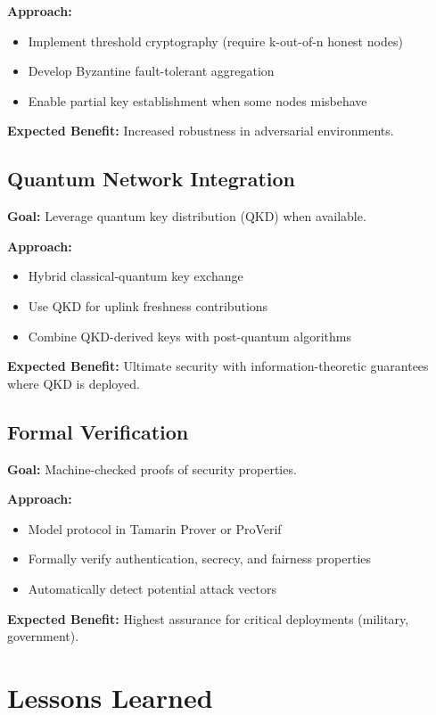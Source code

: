 \documentclass[12pt,a4paper]{report}
\begin{document}
\textbf{Approach:}
\begin{itemize}
\item Implement threshold cryptography (require k-out-of-n honest nodes)
\item Develop Byzantine fault-tolerant aggregation
\item Enable partial key establishment when some nodes misbehave
\end{itemize}

\textbf{Expected Benefit:} Increased robustness in adversarial environments.

\subsection{Quantum Network Integration}

\textbf{Goal:} Leverage quantum key distribution (QKD) when available.

\textbf{Approach:}
\begin{itemize}
\item Hybrid classical-quantum key exchange
\item Use QKD for uplink freshness contributions
\item Combine QKD-derived keys with post-quantum algorithms
\end{itemize}

\textbf{Expected Benefit:} Ultimate security with information-theoretic guarantees where QKD is deployed.

\subsection{Formal Verification}

\textbf{Goal:} Machine-checked proofs of security properties.

\textbf{Approach:}
\begin{itemize}
\item Model protocol in Tamarin Prover or ProVerif
\item Formally verify authentication, secrecy, and fairness properties
\item Automatically detect potential attack vectors
\end{itemize}

\textbf{Expected Benefit:} Highest assurance for critical deployments (military, government).

\section{Lessons Learned}
\end{document}
